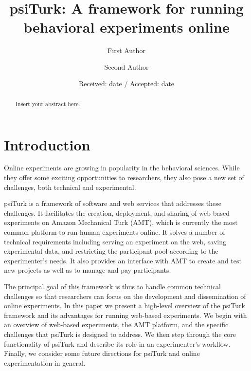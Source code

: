 \documentclass[twocolumn]{svjour3}          %
\begin{document}
\title{psiTurk: A framework for running behavioral experiments online}

\author{First Author         \and
        Second Author %
}




\date{Received: date / Accepted: date}

\maketitle

\begin{abstract}
Insert your abstract here.
\end{abstract}


\section{Introduction}

Online experiments are growing in popularity in the behavioral sciences.
While they offer some exciting opportunities to researchers, they also pose 
a new set of challenges, both technical and experimental.

psiTurk is a framework of software and web services that addresses these challenges. 
It facilitates the creation, deployment, and sharing of web-based experiments on Amazon Mechanical Turk (AMT),
 which is currently the most common platform to run human experiments online.
It solves a number of technical requirements including serving an experiment on the web, saving experimental data, and restricting the participant pool according to the experimenter's needs. It also provides an interface with AMT to create and test new projects as well as to manage and
 pay participants.

The principal goal of this framework is thus to handle common technical challenges so that researchers can focus on the development and dissemination of online experiments.
In this paper we present a high-level overview of the psiTurk framework and its advantages for running web-based experiments.
We begin with an overview of web-based experiments, the AMT platform, and the specific challenges that psiTurk is designed to address.
We then step through the core functionality of psiTurk and describe its role in an experimenter's workflow.
Finally, we consider some future directions for psiTurk and online experimentation in general.
\end{document}
